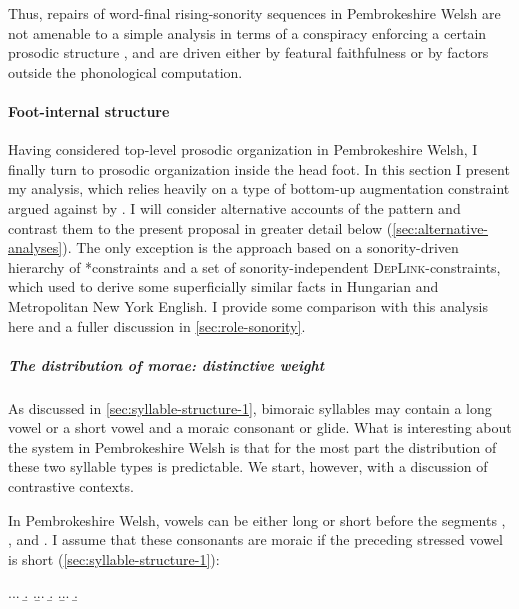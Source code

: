 Thus, repairs of word-final rising\hyp sonority sequences in Pembrokeshire Welsh are not amenable to a simple analysis in terms of a conspiracy enforcing a certain prosodic structure \citep{hannahs09:_welsh}, and are driven either by featural faithfulness or by factors outside the phonological computation.

\paragraph{Foot-internal structure}
\label{sec:foot-intern-struct}

Having considered top-level prosodic organization in Pembrokeshire Welsh, I finally turn to prosodic organization inside the head foot. In this section I present my analysis, which relies heavily on a type of bottom\hyp up augmentation constraint argued against by \citet{moren01:_distin}. I will consider alternative accounts of the pattern and contrast them to the present proposal in greater detail below (\cref{sec:alternative-analyses}). The only exception is the approach based on a sonority\hyp driven hierarchy of *\mo constraints and a set of sonority\hyp independent \textsc{DepLink}-\mo constraints, which \citet{moren01:_distin} used to derive some superficially similar facts in Hungarian and Metropolitan New York English. I provide some comparison with this analysis here and a fuller discussion in \cref{sec:role-sonority}.

\subparagraph{The distribution of morae: distinctive weight}
\label{sec:distrbiution-morae}

As discussed in \cref{sec:syllable-structure-1}, bimoraic syllables may contain a long vowel or a short vowel and a moraic consonant or glide. What is interesting about the system in Pembrokeshire Welsh is that for the most part the distribution of these two syllable types is predictable. We start, however, with a discussion of contrastive contexts.

In Pembrokeshire Welsh, vowels can be either long or short before the segments \ipa{[n]}, \ipa{[l]}, and \ipa{[r]}. I assume that these consonants are moraic if the preceding stressed vowel is short (\cref{sec:syllable-structure-1}):

\ex.\a.\a.
\b.
\z.\b.\a.
\b.
\z.\b.\a.
\b.


